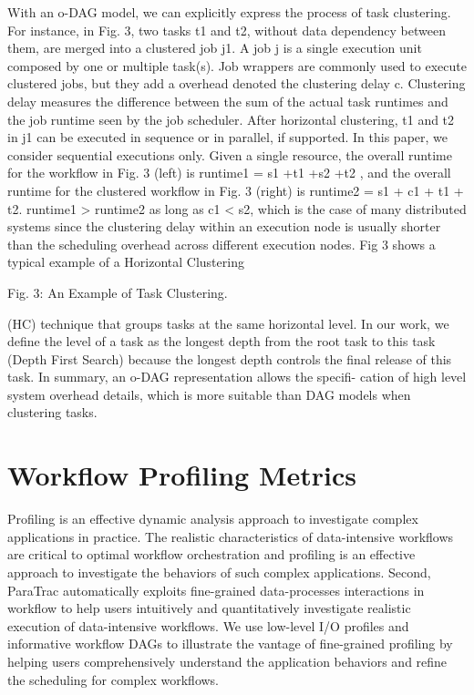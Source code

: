 With an o-DAG model, we can explicitly express the process of task clustering. For instance, in Fig. 3, two tasks t1 and t2, without data dependency between them, are merged into a clustered job j1. A job j is a single execution unit composed by one or multiple task(s). Job wrappers are commonly used to execute clustered jobs, but they add a overhead denoted the clustering delay c. Clustering delay measures the difference between the sum of the actual task runtimes and the job runtime seen by the job scheduler. After horizontal clustering, t1 and t2 in j1 can be executed in sequence or in parallel, if supported. In this paper, we consider sequential executions only. Given a single resource, the overall runtime for the workflow in Fig. 3 (left) is runtime1 = s1 +t1 +s2 +t2 , and the overall runtime for the clustered workflow in Fig. 3 (right) is runtime2 = s1 + c1 + t1 + t2. runtime1 > runtime2 as long as c1 < s2, which is the case of many distributed systems since the clustering delay within an execution node is usually shorter than the scheduling overhead across different execution nodes.
Fig 3 shows a typical example of a Horizontal Clustering

Fig. 3: An Example of Task Clustering.

(HC) technique that groups tasks at the same horizontal level. In our work, we define the level of a task as the longest depth from the root task to this task (Depth First Search) because the longest depth controls the final release of this task.
In summary, an o-DAG representation allows the specifi- cation of high level system overhead details, which is more suitable than DAG models when clustering tasks.

\section{Workflow Profiling Metrics}
\label{sec:profiling}

Profiling is an effective dynamic analysis approach to investigate complex applications in practice. The realistic characteristics of data-intensive workflows are critical to optimal workflow orchestration and profiling is an effective approach to investigate the behaviors of such complex applications. Second, ParaTrac automatically exploits fine-grained data-processes interactions in workflow to help users intuitively and quantitatively investigate realistic execution of data-intensive workflows. We use low-level I/O profiles and informative workflow DAGs to illustrate the vantage of fine-grained profiling by helping users comprehensively understand the application behaviors and refine the scheduling for complex workflows.

